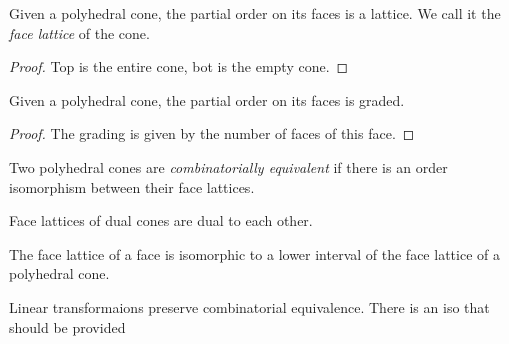 \begin{lemma}
  \label{face-lattice}
  Given a polyhedral cone, the partial order on its faces
  is a lattice. We call it the \emph{face lattice} of the cone.
\end{lemma}
\begin{proof}
Top is the entire cone, bot is the empty cone.
\end{proof}

\begin{lemma}
  \label{face-lattice-graded}
  Given a polyhedral cone, the partial order on its faces
  is graded.
\end{lemma}
\begin{proof}
The grading is given by the number of faces of this face.
\end{proof}

\begin{definition}
  \label{combinatorial-equivalence}
  Two polyhedral cones are \emph{combinatorially equivalent} if there
  is an order isomorphism between their face lattices.
\end{definition}

\begin{proposition}
  \label{dual-face-lattice}
  Face lattices of dual cones are dual to each other.
\end{proposition}

\begin{proposition}
  \label{face-face-lattice}
  The face lattice of a face is isomorphic to a lower interval of the face lattice of a polyhedral cone.
\end{proposition}

\begin{proposition}
  \label{ombinatorial-equivalence-linear-transformaions}
  Linear transformaions preserve combinatorial equivalence. There is an iso that should be provided
\end{proposition}



